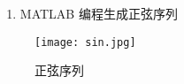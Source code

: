 \begin{enumerate}
    \item MATLAB 编程生成正弦序列
\end{enumerate}

\begin{figure}[ht]
    \centering
    \texttt{[image: sin.jpg]}
    \caption{正弦序列}
\end{figure}